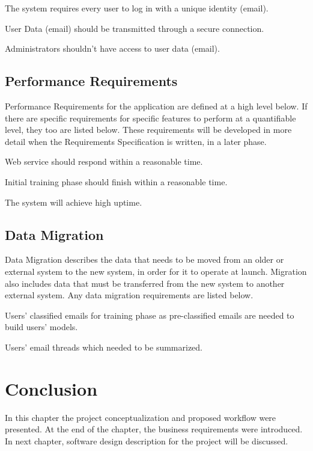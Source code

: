 \begin{my_enumerate}
  \item The system requires every user to log in with a unique identity (email).
  \item User Data (email) should be transmitted through a secure connection.
  \item Administrators shouldn’t have access to user data (email).
\end{my_enumerate}



\subsection{Performance Requirements}
Performance Requirements for the application are defined at a high level below. 
If there are specific requirements for specific features to perform at a quantifiable 
level, they too are listed below. These requirements will be developed in more detail when 
the Requirements Specification is written, in a later phase.

\begin{my_enumerate}
  \item Web service should respond within a reasonable time.
  \item Initial training phase should finish within a reasonable time.
  \item The system will achieve high uptime.
\end{my_enumerate}


\subsection{Data Migration}
Data Migration describes the data that needs to be moved from an older or external 
system to the new system, in order for it to operate at launch. Migration also includes 
data that must be transferred from the new system to another external system. 
Any data migration requirements are listed below.

\begin{my_enumerate}
  \item Users' classified emails for training phase as pre-classified emails are needed to build users' models.
  \item Users' email threads which needed to be summarized.
\end{my_enumerate}

\section{Conclusion}
In this chapter the project conceptualization and proposed workflow were presented. At the end of the chapter, the business requirements were introduced. In next chapter, software design description for the project will be discussed.

